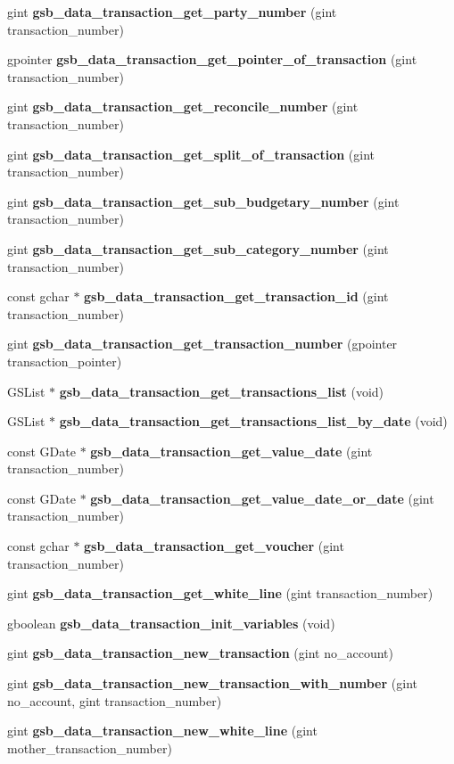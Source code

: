 \begin{DoxyCompactItemize}
\item 
gint {\bf gsb\_\-data\_\-transaction\_\-get\_\-party\_\-number} (gint transaction\_\-number)
\item 
gpointer {\bf gsb\_\-data\_\-transaction\_\-get\_\-pointer\_\-of\_\-transaction} (gint transaction\_\-number)
\item 
gint {\bf gsb\_\-data\_\-transaction\_\-get\_\-reconcile\_\-number} (gint transaction\_\-number)
\item 
gint {\bf gsb\_\-data\_\-transaction\_\-get\_\-split\_\-of\_\-transaction} (gint transaction\_\-number)
\item 
gint {\bf gsb\_\-data\_\-transaction\_\-get\_\-sub\_\-budgetary\_\-number} (gint transaction\_\-number)
\item 
gint {\bf gsb\_\-data\_\-transaction\_\-get\_\-sub\_\-category\_\-number} (gint transaction\_\-number)
\item 
const gchar $\ast$ {\bf gsb\_\-data\_\-transaction\_\-get\_\-transaction\_\-id} (gint transaction\_\-number)
\item 
gint {\bf gsb\_\-data\_\-transaction\_\-get\_\-transaction\_\-number} (gpointer transaction\_\-pointer)
\item 
GSList $\ast$ {\bf gsb\_\-data\_\-transaction\_\-get\_\-transactions\_\-list} (void)
\item 
GSList $\ast$ {\bf gsb\_\-data\_\-transaction\_\-get\_\-transactions\_\-list\_\-by\_\-date} (void)
\item 
const GDate $\ast$ {\bf gsb\_\-data\_\-transaction\_\-get\_\-value\_\-date} (gint transaction\_\-number)
\item 
const GDate $\ast$ {\bf gsb\_\-data\_\-transaction\_\-get\_\-value\_\-date\_\-or\_\-date} (gint transaction\_\-number)
\item 
const gchar $\ast$ {\bf gsb\_\-data\_\-transaction\_\-get\_\-voucher} (gint transaction\_\-number)
\item 
gint {\bf gsb\_\-data\_\-transaction\_\-get\_\-white\_\-line} (gint transaction\_\-number)
\item 
gboolean {\bf gsb\_\-data\_\-transaction\_\-init\_\-variables} (void)
\item 
gint {\bf gsb\_\-data\_\-transaction\_\-new\_\-transaction} (gint no\_\-account)
\item 
gint {\bf gsb\_\-data\_\-transaction\_\-new\_\-transaction\_\-with\_\-number} (gint no\_\-account, gint transaction\_\-number)
\item 
gint {\bf gsb\_\-data\_\-transaction\_\-new\_\-white\_\-line} (gint mother\_\-transaction\_\-number)

\end{DoxyCompactItemize}
